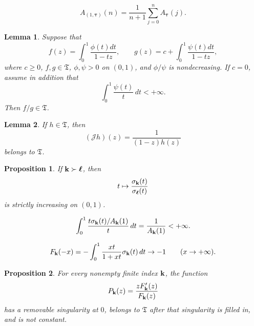 \documentclass[10pt,a4paper]{amsart}
\newtheorem{lem}{Lemma}
\newtheorem{prop}{Proposition}
\begin{document}
\begin{equation}\label{ArecC}
A_{(1,{\boldsymbol\tau})}(n)
=\frac1{n+1}\sum_{j=0}^{n}A_{\boldsymbol\tau}(j).
\end{equation}

\begin{lem}\label{quotientlemma}
Suppose that
\[
f(z)=\int_0^1\frac{\phi(t)dt}{1-tz},
\qquad
g(z)=c+\int_0^1\frac{\psi(t)dt}{1-tz},
\]
where $c\geq 0$, $f,g\in\mathfrak{T}$, $\phi,
\psi>0$ on $(0,1)$, and $\phi/\psi$ is nondecreasing.  If $c=0$, assume in addition that
\begin{equation}\label{psiintegrable}
\int_0^1\frac{\psi(t)}t\,dt<+\infty.
\end{equation}
Then $f/g\in\mathfrak{T}$.
\end{lem}

\begin{lem}\label{involution}
If $h\in\mathfrak{T}$, then
\begin{equation}\label{Jdef}
(\mathcal{J}h)(z)=\frac1{(1-z)h(z)}
\end{equation}
belongs to $\mathfrak{T}$.
\end{lem}

\begin{prop}\label{strictMLR}
If ${\bf k}\succ{\boldsymbol\ell}$, then
\begin{equation}\label{MLRratio}
t\mapsto\frac{\sigma_{\bf k}(t)}{\sigma_{\boldsymbol\ell}(t)}
\end{equation}
is strictly increasing on $(0,1)$.
\end{prop}

\begin{equation}\label{denintegrable}
\int_0^1\frac{t\sigma_{\bf k}(t)/A_{\bf k}(1)}t\,dt
=\frac1{A_{\bf k}(1)}<+\infty.
\end{equation}

\begin{equation}\label{Fminusinfty}
F_{\bf k}(-x)
=-\int_0^1\frac{xt}{1+xt}\sigma_{\bf k}(t)\,dt
\rightarrow -1
\qquad(x\rightarrow+\infty).
\end{equation}

\begin{prop}\label{logderivative}
For every nonempty finite index ${\bf k}$, the function
\begin{equation}\label{Pdef}
P_{\bf k}(z)=\frac{zF_{\bf k}'(z)}{F_{\bf k}(z)}
\end{equation}
has a removable singularity at $0$, belongs to $\mathfrak{T}$ after that singularity is filled in, and is not constant.
\end{prop}
\end{document}
